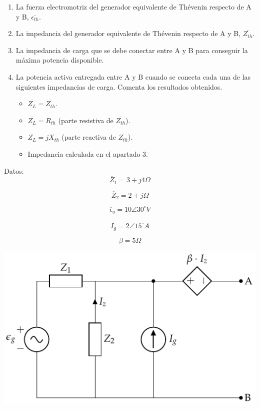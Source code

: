\begin{enumerate}
\item La fuerza electromotriz del generador equivalente de Thévenin respecto de A y B,  \(\overline{\epsilon_{th}}\).
\item La impedancia del generador equivalente de Thévenin respecto de A y B, \(\overline{Z_{th}}\).
\item La impedancia de carga que se debe conectar entre A y B para conseguir la máxima potencia disponible.
\item La potencia activa entregada entre A y B cuando se conecta cada una de las siguientes impedancias de carga. Comenta los resultados obtenidos.
\begin{itemize}
\item \(\overline{Z_L} = \overline{Z_{th}}\).
\item \(\overline{Z_L} = R_{th}\) (parte resistiva de \(\overline{Z_{th}}\)).
\item \(\overline{Z_L} = j X_{th}\) (parte reactiva de \(\overline{Z_{th}}\)).
\item Impedancia calculada en el apartado 3.
\end{itemize}
\end{enumerate}

\begin{minipage}{0.3\linewidth}
Datos:
\[
\overline{Z}_1 = 3 + j4\Omega
\]

\[
\overline{Z}_2 = 2 + j\Omega
\]

\[
\overline{\epsilon}_g = 10\angle 30^{\circ} V 
\]

\[
\overline{I}_g = 2\angle 15^{\circ} A
\]

\[
\beta = 5 \Omega
\]
\end{minipage}
\begin{minipage}{0.7\linewidth}
\includegraphics[width=.9\linewidth]{figuras/thevenin6.pdf}
\end{minipage}

